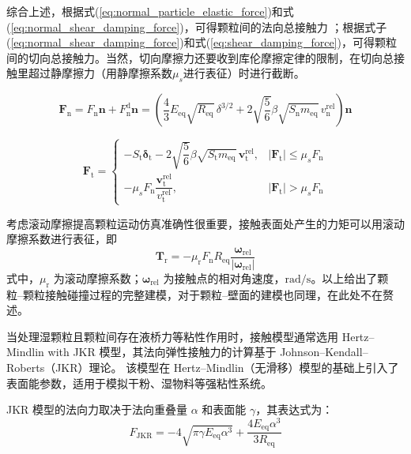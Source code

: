 综合上述，根据式(\ref{eq:normal_particle_elastic_force})和式(\ref{eq:normal_shear_damping_force})，可得颗粒间的法向总接触力 ；根据式子(\ref{eq:normal_shear_damping_force})和式(\ref{eq:shear_damping_force})，可得颗粒间的切向总接触力。当然，切向摩擦力还要收到库伦摩擦定律的限制，在切向总接触里超过静摩擦力（用静摩擦系数\(\mu_s\)进行表征）时进行截断。

\begin{equation}
    \bm{F}_{\mathrm{n}} = F_{\mathrm{n}}\bm{n} + F_{\mathrm{n}}^{\mathrm{d}}\bm{n} = \left(\frac{4}{3}E_{\mathrm{eq}}\sqrt{R_{\mathrm{eq}}}\,\delta^{3/2} + 2\sqrt{\frac{5}{6}}\beta\sqrt{S_{\mathrm{n}}m_{\mathrm{eq}}}\,v_{\mathrm{n}}^{\mathrm{rel}}\right)\bm{n}
    \label{eq:total_normal_force}
\end{equation}

\begin{equation}
    \bm{F}_{\mathrm{t}} = 
    \begin{cases}
        -S_{\mathrm{t}}\bm{\delta}_{\mathrm{t}} - 2\sqrt{\dfrac{5}{6}}\beta\sqrt{S_{\mathrm{t}}m_{\mathrm{eq}}}\,\bm{v}_{\mathrm{t}}^{\mathrm{rel}}, & |\bm{F}_{\mathrm{t}}| \leq \mu_s F_{\mathrm{n}} \\[10pt]
        -\mu_s F_{\mathrm{n}} \dfrac{\bm{v}_{\mathrm{t}}^{\mathrm{rel}}}{v_{\mathrm{t}}^{\mathrm{rel}}}, & |\bm{F}_{\mathrm{t}}| > \mu_s F_{\mathrm{n}}
    \end{cases}
    \label{eq:total_shear_force}
\end{equation}

考虑滚动摩擦提高颗粒运动仿真准确性很重要，接触表面处产生的力矩可以用滚动摩擦系数进行表征，即
\begin{equation}
    \bm{T}_{\mathrm{r}} = -\mu_{\mathrm{r}} F_{\mathrm{n}} R_{\mathrm{eq}} \frac{\bm{\omega}_{\mathrm{rel}}}{|\bm{\omega}_{\mathrm{rel}}|}
    \label{eq:rolling_torque}
\end{equation}
式中，\(\mu_{\mathrm{r}}\) 为滚动摩擦系数；\(\bm{\omega}_{\mathrm{rel}}\) 为接触点的相对角速度，\(\mathrm{rad/s}\)。以上给出了颗粒--颗粒接触碰撞过程的完整建模，对于颗粒--壁面的建模也同理，在此处不在赘述。

当处理湿颗粒且颗粒间存在液桥力等粘性作用时，接触模型通常选用 Hertz--Mindlin with JKR 模型，其法向弹性接触力的计算基于 Johnson--Kendall--Roberts（JKR）理论。
该模型在 Hertz--Mindlin（无滑移）模型的基础上引入了表面能参数，适用于模拟干粉、湿物料等强粘性系统。

JKR 模型的法向力取决于法向重叠量 $\alpha$ 和表面能 $\gamma$，其表达式为：
\begin{equation}
    F_{\mathrm{JKR}}
    = -4\sqrt{\pi\gamma E_{\mathrm{eq}}\alpha^{3}}
    + \frac{4E_{\mathrm{eq}}\alpha^{3}}{3R_{\mathrm{eq}}}
    \label{eq:JKR_force}
\end{equation}

